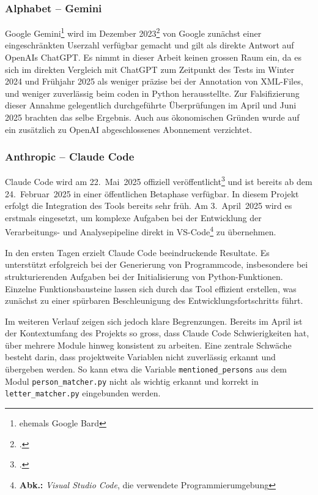\documentclass[12pt, a4paper, ngerman, bidi=default]{article}
\let\cite\footcite
\begin{document}
\subsubsection{Alphabet – Gemini}
Google Gemini\footnote{ehemals Google Bard} wird im Dezember 2023\cite{noauthor_gemini_2023} von Google zunächst einer eingeschränkten Userzahl verfügbar gemacht und gilt als direkte Antwort auf OpenAIs ChatGPT. Es nimmt in dieser Arbeit keinen grossen Raum ein, da es sich im direkten Vergleich mit ChatGPT zum Zeitpunkt des Tests im Winter 2024 und Frühjahr 2025 als weniger präzise bei der Annotation von XML-Files, und weniger zuverlässig beim coden in Python herausstellte. Zur Falsifizierung dieser Annahme gelegentlich durchgeführte Überprüfungen im April und Juni 2025 brachten das selbe Ergebnis. Auch aus ökonomischen Gründen wurde auf ein zusätzlich zu OpenAI abgeschlossenes Abonnement verzichtet.

\subsubsection{Anthropic – Claude Code}\label{subsec:claude_code}

Claude Code wird am 22.~Mai~2025 offiziell veröffentlicht\cite{noauthor_claude_nodate} und ist bereits ab dem 24.~Februar~2025 in einer öffentlichen Betaphase verfügbar. In diesem Projekt erfolgt die Integration des Tools bereits sehr früh. Am 3.~April~2025 wird es erstmals eingesetzt, um komplexe Aufgaben bei der Entwicklung der Verarbeitungs- und Analysepipeline direkt in VS-Code\footnote{\textbf{Abk.:} \textit{Visual Studio Code}, die verwendete Programmierumgebung} zu übernehmen.

In den ersten Tagen erzielt Claude Code beeindruckende Resultate. Es unterstützt erfolgreich bei der Generierung von Programmcode, insbesondere bei strukturierenden Aufgaben bei der Initialisierung von Python-Funktionen. Einzelne Funktionsbausteine lassen sich durch das Tool effizient erstellen, was zunächst zu einer spürbaren Beschleunigung des Entwicklungsfortschritts führt.

Im weiteren Verlauf zeigen sich jedoch klare Begrenzungen. Bereits im April ist der Kontextumfang des Projekts so gross, dass Claude Code Schwierigkeiten hat, über mehrere Module hinweg konsistent zu arbeiten. Eine zentrale Schwäche besteht darin, dass projektweite Variablen nicht zuverlässig erkannt und übergeben werden. So kann etwa die Variable \texttt{mentioned\_persons} aus dem Modul \texttt{person\_matcher.py} nicht als wichtig erkannt und korrekt in \texttt{letter\_matcher.py} eingebunden werden.
\end{document}
